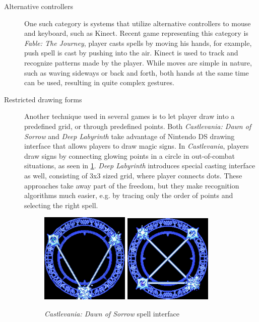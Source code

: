 \begin{description}
\item[Alternative controllers]
One such category is systems that utilize alternative controllers to mouse and keyboard, such as Kinect. Recent game representing this category is \emph{Fable: The Journey}, player casts spells by moving his hands, for example, push spell is cast by pushing into the air. Kinect is used to track and recognize patterns made by the player. While moves are simple in nature, such as waving sideways or back and forth, both hands at the same time can be used, resulting in quite complex gestures.

\item[Restricted drawing forms]
Another technique used in several games is to let player draw into a predefined grid, or through predefined points. Both \emph{Castlevania: Dawn of Sorrow} and \emph{Deep Labyrinth} take advantage of Nintendo DS drawing interface that allows players to draw magic signs. In \emph{Castlevania}, players draw signs by connecting glowing points in a circle in out-of-combat situations, as seen in \cref{fig:castlevania}. \emph{Deep Labyrinth} introduces special casting interface as well, consisting of 3x3 sized grid, where player connects dots. These approaches take away part of the freedom, but they make recognition algorithms much easier, e.g. by tracing only the order of points and selecting the right spell.

\begin{figure}
\centering
\includegraphics[width=.3\linewidth]{ext/castlevania.png}
\quad
\includegraphics[width=.3\linewidth]{ext/castlevania2.png}
\caption{\emph{Castlevania: Dawn of Sorrow} spell interface }
\label{fig:castlevania} %
\end{figure}


\end{description}
